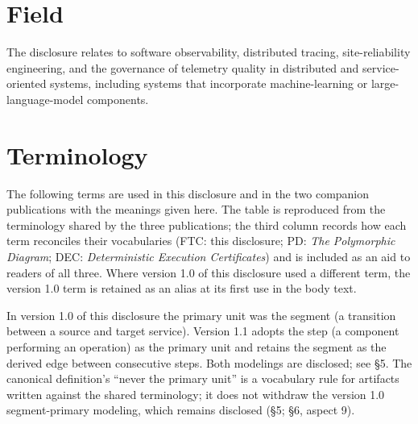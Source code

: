 \documentclass[11pt]{article}
\begin{document}
\section{Field}
The disclosure relates to software observability, distributed tracing, site-reliability engineering, and the governance of telemetry quality in distributed and service-oriented systems, including systems that incorporate machine-learning or large-language-model components.

\section*{Terminology}
The following terms are used in this disclosure and in the two companion publications with the meanings given here. The table is reproduced from the terminology shared by the three publications; the third column records how each term reconciles their vocabularies (FTC: this disclosure; PD: \emph{The Polymorphic Diagram}; DEC: \emph{Deterministic Execution Certificates}) and is included as an aid to readers of all three. Where version 1.0 of this disclosure used a different term, the version 1.0 term is retained as an alias at its first use in the body text.

In version 1.0 of this disclosure the primary unit was the segment (a transition between a source and target service). Version 1.1 adopts the step (a component performing an operation) as the primary unit and retains the segment as the derived edge between consecutive steps. Both modelings are disclosed; see \S5. The canonical definition's ``never the primary unit'' is a vocabulary rule for artifacts written against the shared terminology; it does not withdraw the version 1.0 segment-primary modeling, which remains disclosed (\S5; \S6, aspect 9).
\end{document}

